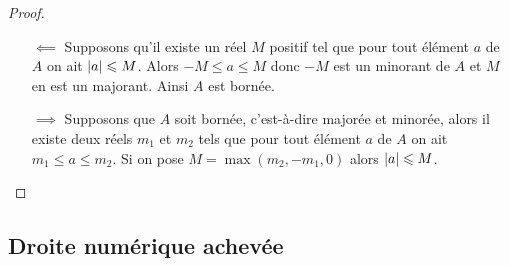   \begin{proof}
    \begin{itemize}
      \item[\(\impliedby\)] Supposons qu'il existe un réel \(M\) positif tel que 
        pour tout élément \(a\) de \(A\) on ait \(\left\lvert a\right\rvert\leqslant M\). Alors \( 
        - M\leqslant a\leqslant M\) donc \( - M\) est un minorant de \(A\) et 
        \(M\) en est un majorant. Ainsi \(A\) est bornée.
      \item[\(\implies\)] Supposons que \(A\) soit bornée, c'est-à-dire majorée 
        et minorée, alors il existe deux réels \(m_1\) et \(m_2\) tels que pour 
        tout élément \(a\) de \(A\) on ait \(m_1\leqslant a\leqslant m_2\). Si 
        on pose \(M = \max(m_2, - m_1, 0)\) alors \(\left\lvert a\right\rvert\leqslant M\).
    \end{itemize}
  \end{proof}

  \subsection{Droite numérique achevée}

